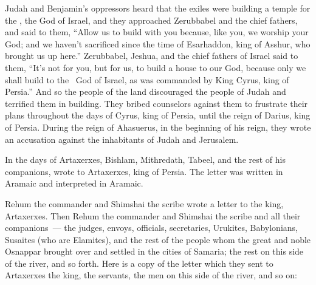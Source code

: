 
\begin{inparaenum}
   Judah and Benjamin's oppressors heard that the exiles were building a temple for the \lord, the God of Israel,%
   and they approached Zerubbabel and the chief fathers, and said to them, ``Allow us to build with you because, like you, we worship your God; and we haven't sacrificed since the time of Esarhaddon, king of Asshur, who brought us up here.''%
   Zerubbabel, Jeshua, and the chief fathers of Israel said to them, ``It's not for you, but for us, to build a house to our God, because only we shall build to the \lord\ God of Israel, as was commanded by King Cyrus, king of Persia.''%
   And so the people of the land discouraged the people of Judah and terrified them in building.%
   They bribed counselors against them to frustrate their plans throughout the days of Cyrus, king of Persia, until the reign of Darius, king of Persia.%
   During the reign of Ahasuerus, in the beginning of his reign, they wrote an accusation against the inhabitants of Judah and Jerusalem.%
  
   In the days of Artaxerxes, Bishlam, Mithredath, Tabeel, and the rest of his companions, wrote to Artaxerxes, king of Persia. The letter was written in Aramaic and interpreted in Aramaic.%
  
   Rehum the commander and Shimshai the scribe wrote a letter to the king, Artaxerxes.%
   Then Rehum the commander and Shimshai the scribe and all their companions~--- the judges, envoys, officials, secretaries, Urukites, Babylonians, Susaites (who are Elamites),%
   and the rest of the people whom the great and noble Osnappar brought over and settled in the cities of Samaria; the rest on this side of the river, and so forth.%
   Here is a copy of the letter which they sent to Artaxerxes the king, the servants, the men on this side of the river, and so on:%
  

\end{inparaenum}
